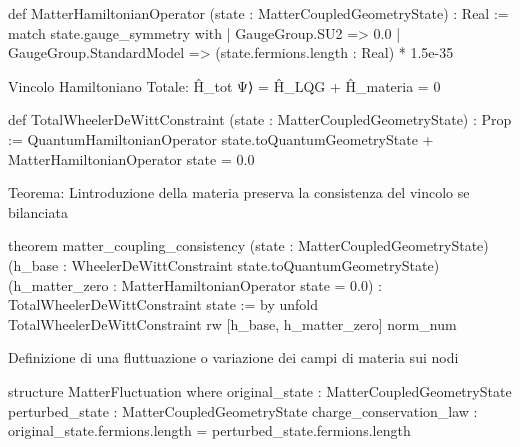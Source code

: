 \documentclass{article}
\newenvironment{Shaded}{%
  \begin{snugshade}%
}{%
  \end{snugshade}%
}%
\newenvironment{Highlighting}{%
}{%
}%
\newcommand{\NormalTok}[1]{#1}
\begin{document}
\begin{Shaded}
\begin{Highlighting}[]
\NormalTok{def MatterHamiltonianOperator (state : MatterCoupledGeometryState) : Real :=}
\NormalTok{  match state.gauge\_symmetry with}
\NormalTok{  | GaugeGroup.SU2 =\textgreater{} 0.0}
\NormalTok{  | GaugeGroup.StandardModel =\textgreater{} (state.fermions.length : Real) * 1.5e{-}35}

\end{Highlighting}
\end{Shaded}

Vincolo Hamiltoniano Totale: Ĥ\_tot \textbar Ψ⟩ = Ĥ\_LQG + Ĥ\_materia =
0

\begin{Shaded}
\begin{Highlighting}[]
\NormalTok{def TotalWheelerDeWittConstraint (state : MatterCoupledGeometryState) : Prop :=}
\NormalTok{  QuantumHamiltonianOperator state.toQuantumGeometryState + MatterHamiltonianOperator state = 0.0}

\end{Highlighting}
\end{Shaded}

Teorema: L\textquotesingle introduzione della materia preserva la
consistenza del vincolo se bilanciata

\begin{Shaded}
\begin{Highlighting}[]
\NormalTok{theorem matter\_coupling\_consistency (state : MatterCoupledGeometryState) }
\NormalTok{  (h\_base : WheelerDeWittConstraint state.toQuantumGeometryState)}
\NormalTok{  (h\_matter\_zero : MatterHamiltonianOperator state = 0.0) :}
\NormalTok{  TotalWheelerDeWittConstraint state := by}
\NormalTok{  unfold TotalWheelerDeWittConstraint}
\NormalTok{  rw [h\_base, h\_matter\_zero]}
\NormalTok{  norm\_num}

\end{Highlighting}
\end{Shaded}

Definizione di una fluttuazione o variazione dei campi di materia sui
nodi

\begin{Shaded}
\begin{Highlighting}[]
\NormalTok{structure MatterFluctuation where}
\NormalTok{  original\_state : MatterCoupledGeometryState}
\NormalTok{  perturbed\_state : MatterCoupledGeometryState}
\NormalTok{  charge\_conservation\_law : original\_state.fermions.length = perturbed\_state.fermions.length}

\end{Highlighting}
\end{Shaded}
\end{document}
